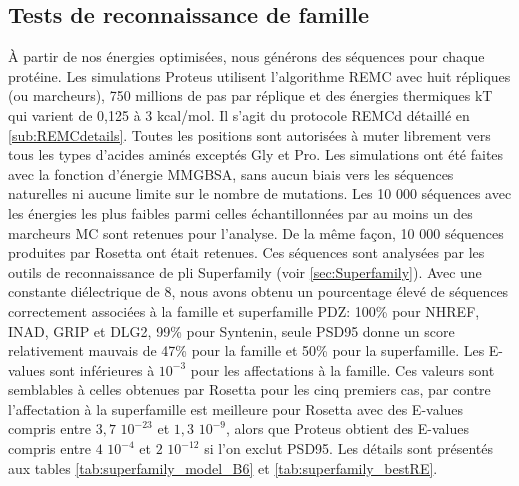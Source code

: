 \subsection{Tests de reconnaissance de famille}
À partir de nos énergies optimisées, nous générons des séquences pour chaque protéine. Les simulations Proteus utilisent l'algorithme REMC avec huit répliques (ou marcheurs), 750 millions de pas par réplique et des énergies thermiques kT  qui varient de 0,125 à 3 kcal/mol. Il s'agit du protocole REMCd détaillé en \ref{sub:REMCdetails}. Toutes les positions sont autorisées à muter librement vers tous les types d'acides aminés exceptés Gly et Pro. Les simulations ont été faites avec la fonction d'énergie MMGBSA, sans aucun biais vers les séquences naturelles ni aucune limite sur le nombre de mutations. Les 10 000 séquences avec les énergies les plus faibles parmi celles échantillonnées par au moins un des marcheurs MC sont retenues pour l'analyse. De la même façon, 10 000 séquences produites par Rosetta ont était retenues. Ces séquences sont analysées par les outils de reconnaissance de pli \og Superfamily \fg (voir \ref{sec:Superfamily}). Avec une constante diélectrique de 8, nous avons obtenu un pourcentage élevé de séquences correctement associées à la famille et superfamille PDZ: 100\% pour NHREF, INAD, GRIP et DLG2, 99\%  pour Syntenin, seule PSD95 donne un score relativement mauvais de 47\% pour la famille et 50\% pour la superfamille. Les E-values sont inférieures à $10^{-3}$ pour les affectations à la famille. Ces valeurs sont semblables à celles obtenues par Rosetta pour les cinq premiers cas, par contre l'affectation à la superfamille est meilleure pour Rosetta avec des E-values compris entre $3,7$ $10^{-23}$ et $1,3$ $10^{-9}$, alors que Proteus obtient des E-values compris entre $4$ $10^{-4}$ et $2$ $10^{-12}$ si l'on exclut PSD95. Les détails sont présentés aux tables \ref{tab:superfamily_model_B6} et \ref{tab:superfamily_bestRE}.


